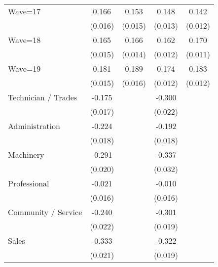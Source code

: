 {\begin{tabular}{l*{4}{c}}
Wave=17             &       0.166\sym{***}&       0.153\sym{***}&       0.148\sym{***}&       0.142\sym{***}\\
                    &     (0.016)         &     (0.015)         &     (0.013)         &     (0.012)         \\
Wave=18             &       0.165\sym{***}&       0.166\sym{***}&       0.162\sym{***}&       0.170\sym{***}\\
                    &     (0.015)         &     (0.014)         &     (0.012)         &     (0.011)         \\
Wave=19             &       0.181\sym{***}&       0.189\sym{***}&       0.174\sym{***}&       0.183\sym{***}\\
                    &     (0.015)         &     (0.016)         &     (0.012)         &     (0.012)         \\
Technician / Trades &      -0.175\sym{***}&                     &      -0.300\sym{***}&                     \\
                    &     (0.017)         &                     &     (0.022)         &                     \\
Administration      &      -0.224\sym{***}&                     &      -0.192\sym{***}&                     \\
                    &     (0.018)         &                     &     (0.018)         &                     \\
Machinery           &      -0.291\sym{***}&                     &      -0.337\sym{***}&                     \\
                    &     (0.020)         &                     &     (0.032)         &                     \\
Professional        &      -0.021         &                     &      -0.010         &                     \\
                    &     (0.016)         &                     &     (0.016)         &                     \\
Community / Service &      -0.240\sym{***}&                     &      -0.301\sym{***}&                     \\
                    &     (0.022)         &                     &     (0.019)         &                     \\
Sales               &      -0.333\sym{***}&                     &      -0.322\sym{***}&                     \\
                    &     (0.021)         &                     &     (0.019)         &                     \\

\end{tabular}}
